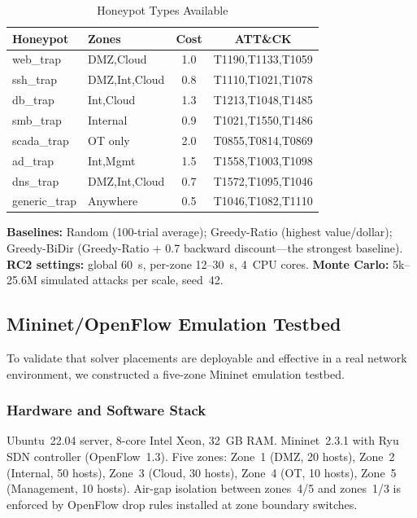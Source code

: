 \documentclass[journal]{IEEEtran}
\begin{document}
\begin{table}[htbp]
\caption{Honeypot Types Available}
\label{tab:profiles}
\centering\renewcommand{\arraystretch}{1.2}
\begin{tabular}{@{}llcc@{}}
\toprule
\textbf{Honeypot}&\textbf{Zones}&\textbf{Cost}&\textbf{ATT\&CK}\\
\midrule
web\_trap&DMZ,Cloud&1.0&T1190,T1133,T1059\\
ssh\_trap&DMZ,Int,Cloud&0.8&T1110,T1021,T1078\\
db\_trap&Int,Cloud&1.3&T1213,T1048,T1485\\
smb\_trap&Internal&0.9&T1021,T1550,T1486\\
scada\_trap&OT only&2.0&T0855,T0814,T0869\\
ad\_trap&Int,Mgmt&1.5&T1558,T1003,T1098\\
dns\_trap&DMZ,Int,Cloud&0.7&T1572,T1095,T1046\\
generic\_trap&Anywhere&0.5&T1046,T1082,T1110\\
\bottomrule
\end{tabular}
\end{table}

\noindent\textbf{Baselines:}
Random (100-trial average);
Greedy-Ratio (highest value/dollar);
Greedy-BiDir (Greedy-Ratio + 0.7 backward discount---the
strongest baseline).
\textbf{RC2 settings:} global 60~s, per-zone 12--30~s,
4~CPU cores.
\textbf{Monte Carlo:} 5k--25.6M simulated attacks per scale,
seed~42.

\subsection{Mininet/OpenFlow Emulation Testbed}
\label{sec:mininet}

To validate that solver placements are deployable and
effective in a real network environment, we constructed a
five-zone Mininet emulation testbed.

\subsubsection{Hardware and Software Stack}

Ubuntu~22.04 server, 8-core Intel Xeon, 32~GB RAM.
Mininet~2.3.1 with Ryu SDN controller (OpenFlow~1.3).
Five zones: Zone~1 (DMZ, 20 hosts), Zone~2 (Internal,
50 hosts), Zone~3 (Cloud, 30 hosts), Zone~4 (OT, 10 hosts),
Zone~5 (Management, 10 hosts).
Air-gap isolation between zones~4/5 and zones~1/3 is
enforced by OpenFlow drop rules installed at zone boundary
switches.
\end{document}
